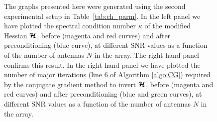 \documentclass[useAMS,usenatbib]{mn2e}
\newcommand{\bmH}{\bmath{\mathcal{H}}}
\begin{document}
\begin{figure}
\centering
{}
\caption{The graphs presented here were generated using the second experimental setup in Table~\ref{tab:ch_parm}. In the left panel we have plotted the spectral condition number $\kappa$ of the modified Hessian $\bmH$, before (magenta and red curves) and after preconditioning (blue curve), at different SNR values as a function of the
number of antennas $N$ in the array. The right hand panel confirms this result. In the right hand panel we have plotted the number of major iterations (line 6 of Algorithm \ref{algo:CG}) required by the conjugate 
gradient method to invert $\bmH$, before (magenta and red curves) and after preconditioning (blue and green curves), at different SNR values as a function of the number of antennas $N$ in the array.   
\label{fig:kappa_itr}} 
\end{figure}
\end{document}
